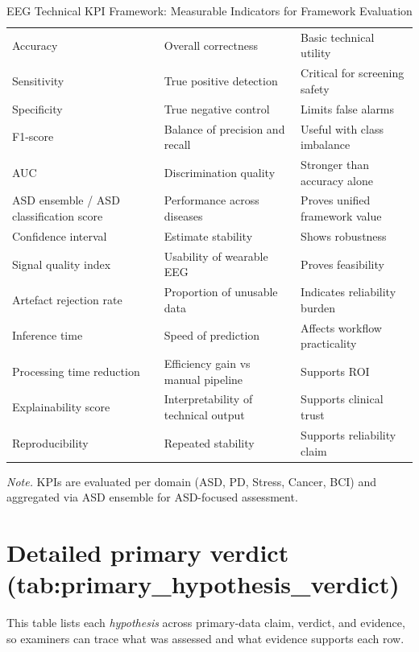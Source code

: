 {\tablestripes\tablefontsize
{}
\begin{xltabular}{\textwidth}{@{} l L L @{}}
\caption[EEG Technical KPI Framework: Measurable Indicators for]{EEG Technical KPI Framework: Measurable Indicators for Framework Evaluation}\label{tab:eeg_kpi} \\
\toprule
{} &  &  \\
\midrule
\endfirsthead
\endhead
\bottomrule
\endlastfoot
Accuracy & Overall correctness & Basic technical utility \\
Sensitivity & True positive detection & Critical for screening safety \\
Specificity & True negative control & Limits false alarms \\
F1-score & Balance of precision and recall & Useful with class imbalance \\
AUC & Discrimination quality & Stronger than accuracy alone \\
ASD ensemble / ASD classification score & Performance across diseases & Proves unified framework value \\
Confidence interval & Estimate stability & Shows robustness \\
Signal quality index & Usability of wearable EEG & Proves feasibility \\
Artefact rejection rate & Proportion of unusable data & Indicates reliability burden \\
Inference time & Speed of prediction & Affects workflow practicality \\
Processing time reduction & Efficiency gain vs manual pipeline & Supports ROI \\
Explainability score & Interpretability of technical output & Supports clinical trust \\
Reproducibility & Repeated stability & Supports reliability claim \\
\end{xltabular}}
\vspace{2pt}
\noindent\textit{Note.} KPIs are evaluated per domain (ASD, PD, Stress, Cancer, BCI) and aggregated via ASD ensemble for ASD-focused assessment.
\fi %


\section{Detailed primary verdict (tab:primary\_\allowbreak hypothesis\_\allowbreak verdict)}
\label{sec:appendix_ch4_tab_primary_hypothesis_verdict}
\noindent This table lists each \textit{hypothesis} across primary-data claim, verdict, and evidence, so examiners can trace what was assessed and what evidence supports each row.



